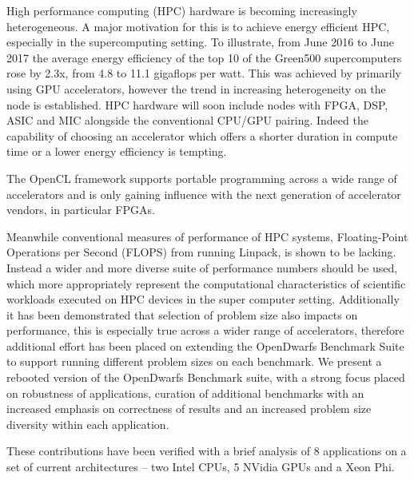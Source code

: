 \documentclass[../document.tex]{subfiles}
\begin{document}
High performance computing (HPC) hardware is becoming increasingly heterogeneous.
A major motivation for this is to achieve energy efficient HPC, especially in the supercomputing setting.
To illustrate, from June 2016 to June 2017 the average energy efficiency of the top 10 of the Green500 supercomputers rose by 2.3x, from 4.8 to 11.1 gigaflops per watt.
This was achieved by primarily using GPU accelerators, however the trend in increasing heterogeneity on the node is established.
HPC hardware will soon include nodes with FPGA, DSP, ASIC and MIC alongside the conventional CPU/GPU pairing.
Indeed the capability of choosing an accelerator which offers a shorter duration in compute time or a lower energy efficiency is tempting.

The OpenCL framework supports portable programming across a wide range of accelerators and is only gaining influence with the next generation of accelerator vendors, in particular FPGAs.

Meanwhile conventional measures of performance of HPC systems, Floating-Point Operations per Second (FLOPS) from running Linpack, is shown to be lacking.
Instead a wider and more diverse suite of performance numbers should be used, which more appropriately represent the computational characteristics of scientific workloads executed on HPC devices in the super computer setting.
Additionally it has been demonstrated that selection of problem size also impacts on performance, this is especially true across a wider range of accelerators, therefore additional effort has been placed on extending the OpenDwarfs Benchmark Suite to support running different problem sizes on each benchmark.
We present a rebooted version of the OpenDwarfs Benchmark suite, with a strong focus placed on robustness of applications, curation of additional benchmarks with an increased emphasis on correctness of results and an increased problem size diversity within each application.

These contributions have been verified with a brief analysis of 8 applications on a set of current architectures -- two Intel CPUs, 5 NVidia GPUs and a Xeon Phi.



\end{document}
